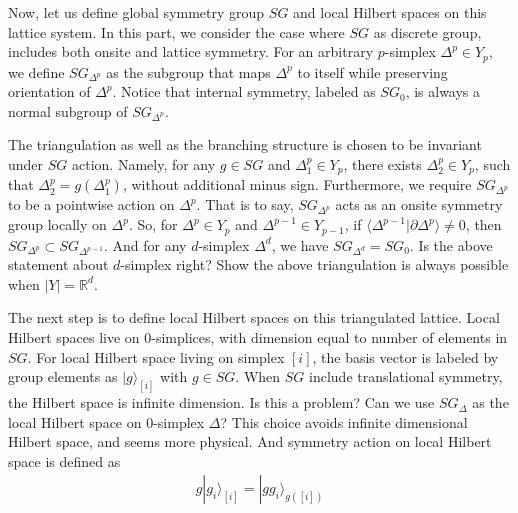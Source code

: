 \documentclass[reprint,amsmath,amssymb,aps,pra,]{revtex4-1}
\begin{document}
Now, let us define global symmetry group $SG$ and local Hilbert spaces on this lattice system. 
In this part, we consider the case where $SG$ as discrete group, includes both onsite and lattice symmetry.
For an arbitrary $p$-simplex $\Delta^p\in Y_p$, we define $SG_{\Delta^p}$ as the subgroup that maps $\Delta^p$ to itself while preserving orientation of $\Delta^p$.
Notice that internal symmetry, labeled as $SG_0$, is always a normal subgroup of $SG_{\Delta^p}$.

The triangulation as well as the branching structure is chosen to be invariant under $SG$ action.
Namely, for any $g\in SG$ and $\Delta_1^p\in Y_p$, there exists $\Delta^p_2\in Y_p$, such that $\Delta^p_2=g(\Delta^p_1)$, without additional minus sign.
Furthermore, we require $SG_{\Delta^p}$ to be a pointwise action on ${\Delta^p}$. 
That is to say, $SG_{\Delta^p}$ acts as an onsite symmetry group locally on $\Delta^p$.
So, for $\Delta^p\in Y_p$ and $\Delta^{p-1}\in Y_{p-1}$, if $\langle\Delta^{p-1}|\partial\Delta^p\rangle\neq0$, then $SG_{\Delta^p}\subset SG_{\Delta^{p-1}}$.
And for any $d$-simplex $\Delta^d$, we have $SG_{\Delta^d}=SG_0$. 
{\color{red} Is the above statement about $d$-simplex right? Show the above triangulation is always possible when $|Y|=\mathbb{R}^d$.}

The next step is to define local Hilbert spaces on this triangulated lattice.
Local Hilbert spaces live on 0-simplices, with dimension equal to number of elements in $SG$.
For local Hilbert space living on simplex $[i]$, the basis vector is labeled by group elements as $|g\rangle_{[i]}$ with $g\in SG$.
{\color{red} When $SG$ include translational symmetry, the Hilbert space is infinite dimension. Is this a problem?
Can we use $SG_\Delta$ as the local Hilbert space on 0-simplex $\Delta$? This choice avoids infinite dimensional Hilbert space, and seems more physical.}
And symmetry action on local Hilbert space is defined as
\begin{align}
  g|g_i\rangle_{[i]}=|g g_i\rangle_{g([i])}%
  \label{}
\end{align}
\end{document}
